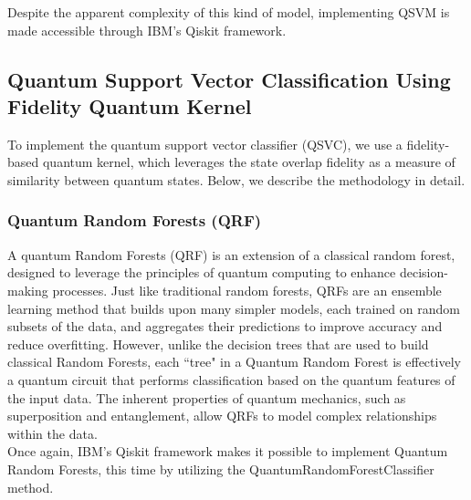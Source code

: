 \documentclass[11pt, oneside]{article}   	%
\begin{document}
\noindent\hspace{10mm}Despite the apparent complexity of this kind of model, implementing QSVM is made accessible through IBM’s Qiskit framework. \subsection{Quantum Support Vector Classification Using Fidelity Quantum Kernel}

To implement the quantum support vector classifier (QSVC), we use a fidelity-based quantum kernel, which leverages the state overlap fidelity as a measure of similarity between quantum states. Below, we describe the methodology in detail.




\subsubsection{Quantum Random Forests (QRF)}

\hspace{10mm} A quantum Random Forests (QRF) is an extension of a classical random forest, designed to leverage the principles of quantum computing to enhance decision-making processes. Just like traditional random forests, QRFs are an ensemble learning method that builds upon many simpler models, each trained on random subsets of the data, and aggregates their predictions to improve accuracy and reduce overfitting. However, unlike the decision trees that are used to build classical Random Forests, each ``tree" in a Quantum Random Forest is effectively a quantum circuit that performs classification based on the quantum features of the input data. The inherent properties of quantum mechanics, such as superposition and entanglement, allow QRFs to model complex relationships within the data. \\

\noindent\hspace{10mm} Once again, IBM’s Qiskit framework makes it possible to implement Quantum Random Forests, this time by utilizing the QuantumRandomForestClassifier method.


\end{document}
